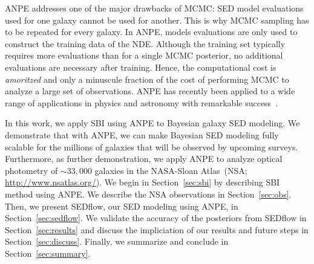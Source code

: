 ANPE addresses one of the major drawbacks of MCMC: SED model evaluations used
for one galaxy cannot be used for another.
This is why MCMC sampling has to be repeated for every galaxy. 
In ANPE, models evaluations are only used to construct the training data of the
NDE. 
Although the training set typically requires more evaluations than for a single
MCMC posterior, no additional evaluations are necessary after training. 
Hence, the computational cost is \emph{amoritzed} and only a minuscule
fraction of the cost of performing MCMC to analyze a large set of observations.
ANPE has recently been applied to a wide range of applications in physics and
astronomy with remarkable success~\citep{stein2020, wong2020, dax2021,
zhang2021}.

In this work, we apply SBI using ANPE to Bayesian galaxy SED modeling. 
We demonstrate that with ANPE, we can make Bayesian SED modeling fully scalable
for the millions of galaxies that will be observed by upcoming surveys.
Furthermore, as further demonstration, we apply ANPE to analyze optical
photometry of ${\sim}33,000$ galaxies in the NASA-Sloan
Atlas~(NSA; \url{http://www.nsatlas.org/}). 
We begin in Section~\ref{sec:sbi} by describing SBI method using ANPE.
We describe the NSA observations in Section~\ref{sec:obs}. 
Then, we present {\sc SEDflow}, our SED modeling using ANPE, in
Section~\ref{sec:sedflow}. 
We validate the accuracy of the posteriors from {\sc SEDflow} in
Section~\ref{sec:results} and discuss the impliciation of our results and
future steps in Section~\ref{sec:discuss}. 
Finally, we summarize and conclude in Section~\ref{sec:summary}. 
